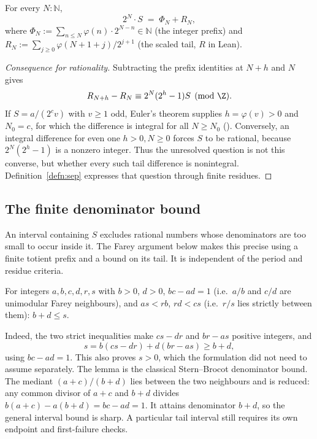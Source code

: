 \begin{prop}
\label{prop:shift}
For every $N : \mathbb{N}$,
\[
2^{N} \cdot S \;=\; \Phi_N + R_N,
\]
where $\Phi_N := \sum_{n \le N} \varphi(n) \cdot 2^{N-n} \in \mathbb{N}$ (the
integer prefix) and $R_N := \sum_{j \ge 0} \varphi(N+1+j)/2^{j+1}$ (the
scaled tail, \ensuremath{{R}} in Lean).
\end{prop}

\begin{proof}[Consequence for rationality]
Subtracting the prefix identities at $N+h$ and $N$ gives
\[
 R_{N+h}-R_N\equiv2^N(2^h-1)S\pmod\Z.
\]
If $S=a/(2^cv)$ with $v\ge1$ odd, Euler's theorem supplies
$h=\varphi(v)>0$ and $N_0=c$, for which the difference is integral for
all $N\ge N_0$
().
Conversely, an integral difference for even one $h>0,N\ge0$
forces $S$ to be rational, because $2^N(2^h-1)$ is a nonzero integer.
Thus the unresolved question is not this converse, but whether every such
tail difference is nonintegral. Definition~\ref{defn:sep} expresses that
question through finite residues.
\end{proof}

\subsection{The finite denominator bound}
\label{ssec:farey}

An interval containing $S$ excludes rational numbers whose
denominators are too small to occur inside it. The Farey argument
below makes this precise using a finite totient prefix and a bound
on its tail. It is independent of the period and residue criteria.

\begin{lem}
\label{lem:farey}
For integers $a,b,c,d,r,s$ with $b>0$, $d>0$, $bc-ad=1$ (i.e.\ $a/b$ and
$c/d$ are unimodular Farey neighbours), and $as < rb$, $rd < cs$ (i.e.\ $r/s$
lies strictly between them): $b+d \le s$.
\end{lem}

Indeed, the two strict inequalities make $cs-dr$ and $br-as$ positive
integers, and
\[
 s=b(cs-dr)+d(br-as)\ge b+d,
\]
using $bc-ad=1$. This also proves $s>0$, which the formulation did not
need to assume separately. The lemma is the classical Stern--Brocot
denominator bound. The mediant $(a+c)/(b+d)$ lies between the two
neighbours and is reduced: any common divisor of $a+c$ and $b+d$
divides $b(a+c)-a(b+d)=bc-ad=1$. It attains denominator $b+d$,
so the general interval bound is sharp. A particular tail interval
still requires its own endpoint and first-failure checks.


